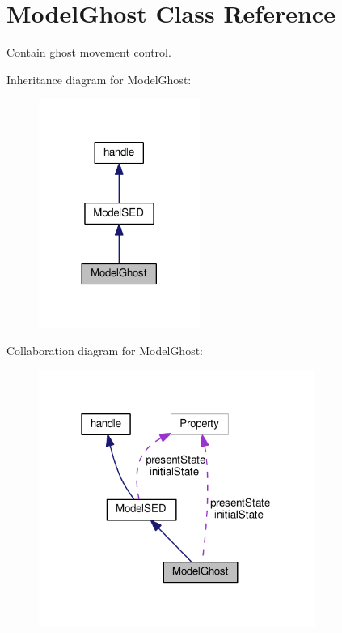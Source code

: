 \hypertarget{class_model_ghost}{}\section{Model\+Ghost Class Reference}
\label{class_model_ghost}


Contain ghost movement control.  




Inheritance diagram for Model\+Ghost\+:
\nopagebreak
\begin{figure}[H]
\begin{center}
\leavevmode
\includegraphics[width=149pt]{class_model_ghost__inherit__graph}
\end{center}
\end{figure}


Collaboration diagram for Model\+Ghost\+:
\nopagebreak
\begin{figure}[H]
\begin{center}
\leavevmode
\includegraphics[width=256pt]{class_model_ghost__coll__graph}
\end{center}
\end{figure}
